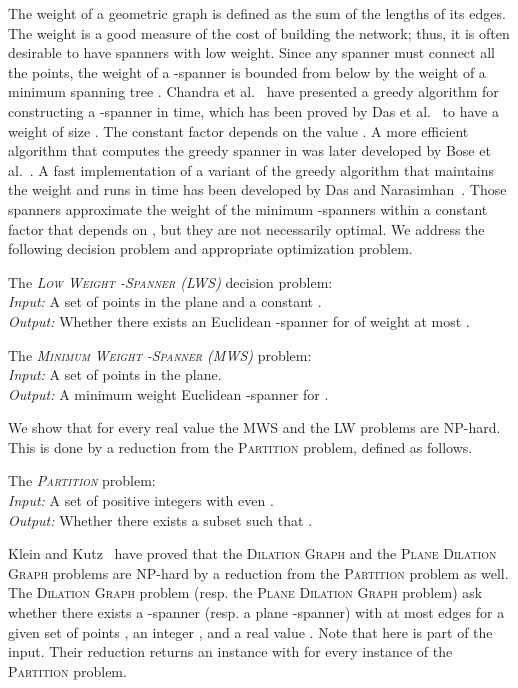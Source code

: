 \documentclass[a4paper]{llncs}
\begin{document}
The weight of a geometric graph is defined as the sum of the lengths of its edges. 
The weight is a good measure of the cost of building the network;
thus, it is often desirable to have spanners with low weight.
Since any spanner must connect all the points, the weight of a -spanner is bounded 
from below by the weight of a minimum spanning tree .
Chandra et al.~\cite{Chandra} have presented a greedy algorithm for constructing 
a -spanner in  time, which has been proved 
by Das et al.~\cite{DasHN93,Das2} to have a weight of size . 
The constant factor depends on the value . 
A more efficient algorithm that computes the greedy spanner in  
was later developed by Bose et al.~\cite{BCFMS08}.
A fast implementation of a variant of the greedy algorithm that maintains the  weight
and runs in  time has been developed by Das and Narasimhan~\cite{DN97}.
Those spanners approximate the weight of the minimum -spanners within a constant factor that
depends on , but they are not necessarily optimal.
We address the following decision problem and appropriate optimization problem.

\begin{myproblem}\label{prob:LWS}
The \emph{\textsc{Low Weight -Spanner} (LWS)} decision problem:\\
\emph{Input:} A set  of points in the plane and a constant .\\
\emph{Output:} Whether there exists an Euclidean -spanner for  of weight at most .
\end{myproblem}

\begin{myproblem}\label{prob:MWS}
The \emph{\textsc{Minimum Weight -Spanner} (MWS)} problem:\\
\emph{Input:} A set  of points in the plane.\\
\emph{Output:} A minimum weight Euclidean -spanner for .
\end{myproblem}



We show that for every real value  the MWS and the LW problems are NP-hard.
This is done by a reduction 
from the \textsc{Partition} problem, defined as follows.
\begin{myproblem}\label{prob:Partition}
The \emph{\textsc{Partition}} problem:\\
\emph{Input:} A set  of  positive integers with even .\\
\emph{Output:} Whether there exists a subset  such that .
\end{myproblem}
Klein and Kutz~\cite{KleinK06} have proved that the \textsc{Dilation Graph} 
and the \textsc{Plane Dilation Graph} problems are NP-hard by a reduction 
from the \textsc{Partition} problem as well.
The \textsc{Dilation Graph} problem (resp. the \textsc{Plane Dilation Graph} problem)
ask whether there exists a -spanner (resp.  a plane -spanner) with at most  edges for a given 
set of points , an integer , and a real value .
Note that here  is part of the input. Their reduction returns an instance with 
for every instance of the \textsc{Partition} problem.
\end{document}

